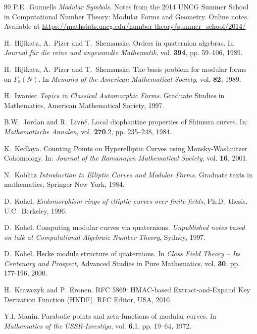 \documentclass[10pt]{amsart}
\theoremstyle{theostyle}
\newcommand{\GG}{\Gamma}
\begin{document}
\begin{thebibliography}{99}
P.E.~Gunnells
{\it Modular Symbols.}
Notes from the 2014 UNCG Summer School in Computational Number Theory: Modular Forms and Geometry. Online notes. Available at \url{https://mathstats.uncg.edu/number-theory/summer_school/2014/}

H.~Hijikata, A.~Pizer and T.~Shemanske.
Orders in quaternion algebras.
In {\it Journal f\"{u}r die reine und angewandte Mathematik}, vol. {\bf 394}, pp. 59--106, 1989. 

H.~Hijikata, A.~Pizer and T.~Shemanske.
The basis problem for modular forms on $\GG_0(N)$.
In {\it Memoirs of the American Mathematical Society}, vol. {\bf 82}, 1989.

H.~Iwaniec
{\it Topics in Classical Automorphic Forms}.
Graduate Studies in Mathematics, American Mathematical Society, 1997.

B.W.~Jordan and R.~Livn\'e. 
Local diophantine properties of Shimura curves. 
In: {\it Mathematische Annalen}, vol. {\bf 270}.2, pp. 235--248, 1984.

K.~Kedlaya. 
Counting Points on Hyperelliptic Curves using Monsky-Washnitzer Cohomology. 
In: {\it Journal of the Ramanujan Mathematical Society}, vol. {\bf 16}, 2001.

N.~Koblitz
{\it Introduction to Elliptic Curves and Modular Forms.}
Graduate texts in mathematics, Springer New York, 1984.

D.~Kohel.
{\it Endomorphism rings of elliptic curves over finite fields},
Ph.D.~thesis, U.C.~Berkeley, 1996.

D.~Kohel.
Computing modular curves via quaternions. 
{\it Unpublished notes based on talk at Computational Algebraic Number Theory}, Sydney, 1997.

D.~Kohel.
Hecke module structure of quaternions.
In {\it Class Field Theory -- Its Centenary and Prospect}, Advanced Studies in Pure Mathematics, vol. {\bf 30}, pp. 177-196, 2000.

H.~Krawczyk and P.~Eronen.  
RFC 5869: HMAC-based Extract-and-Expand Key Derivation Function (HKDF). 
RFC Editor, USA, 2010.

Y.I. Manin.
Parabolic points and zeta-functions of modular curves.
In {\it Mathematics of the USSR-Izvestiya}, vol. {\bf 6}.1, pp. 19–64, 1972.


\end{thebibliography}
\end{document}
